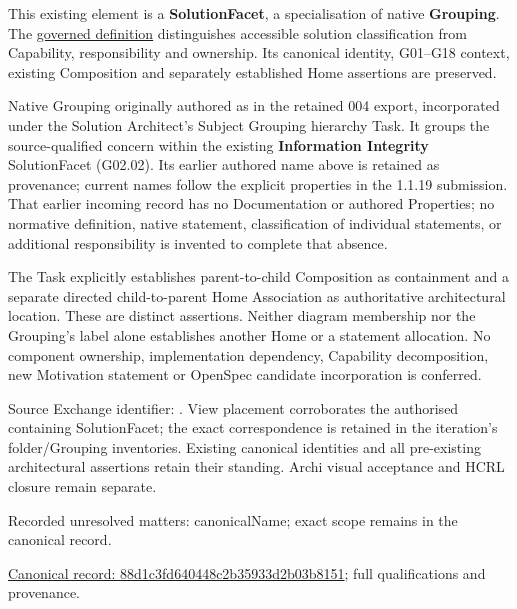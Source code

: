 This existing element is a \textbf{SolutionFacet}, a specialisation of native
\textbf{Grouping}. The \href{\detokenize{../../../../../../../governance/continuum-representation.md#solutionfacet-classification--1119-candidate}}{governed definition}
distinguishes accessible solution classification from Capability, responsibility
and ownership. Its canonical identity, G01–G18 context, existing Composition
and separately established Home assertions are preserved.



Native Grouping originally authored as \texttt{} in the retained 004 export,
incorporated under the Solution Architect's Subject Grouping hierarchy Task.
It groups the source-qualified \texttt{} concern within
the existing \textbf{Information Integrity} SolutionFacet (G02.02). Its earlier authored name above is retained as provenance; current names
follow the explicit properties in the 1.1.19 submission.
That earlier incoming record has no Documentation or authored Properties; no normative
definition, native statement, classification of individual statements, or
additional responsibility is invented to complete that absence.



The Task explicitly establishes parent-to-child Composition as containment and
a separate directed child-to-parent Home Association as authoritative architectural
location. These are distinct assertions. Neither diagram membership nor the
Grouping's label alone establishes another Home or a statement allocation.
No component ownership, implementation dependency, Capability decomposition,
new Motivation statement or OpenSpec candidate incorporation is conferred.



Source Exchange identifier: \texttt{}. View placement corroborates
the authorised containing SolutionFacet; the exact correspondence is retained in the
iteration's folder/Grouping inventories. Existing canonical identities and all
pre-existing architectural assertions retain their standing. Archi visual
acceptance and HCRL closure remain separate.


{\small Recorded unresolved matters: canonicalName; exact scope remains in the canonical record.}\par
{\footnotesize \href{../../../../../../../continuum/grouping/88d1c3fd640448c2b35933d2b03b8151.md}{Canonical record: 88d1c3fd640448c2b35933d2b03b8151}; full qualifications and provenance.}\par
